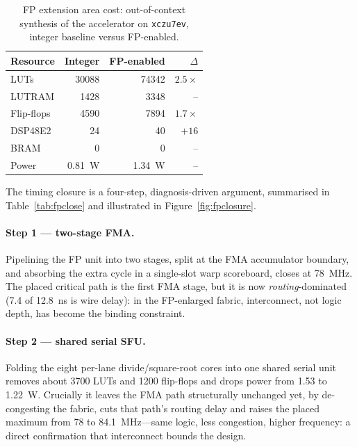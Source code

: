 \documentclass[12pt,a4paper,oneside]{report}
\newcommand{\code}[1]{\texttt{#1}}
\begin{document}
\begin{table}[t]
\caption{FP extension area cost: out-of-context synthesis of the accelerator on
\code{xczu7ev}, integer baseline versus FP-enabled.}
\label{tab:fppa}
\centering
\small
\begin{tabular}{lrrr}
\toprule
Resource & Integer & FP-enabled & $\Delta$\\
\midrule
LUTs         & \num{30088} & \num{74342} & $2.5\times$\\
\quad LUTRAM & \num{1428}  & \num{3348}  & --\\
Flip-flops   & \num{4590}  & \num{7894}  & $1.7\times$\\
DSP48E2      & 24          & 40          & $+16$\\
BRAM         & 0           & 0           & --\\
Power        & 0.81~W      & 1.34~W      & --\\
\bottomrule
\end{tabular}
\end{table}

The timing closure is a four-step, diagnosis-driven argument, summarised in
Table~\ref{tab:fpclose} and illustrated in Figure~\ref{fig:fpclosure}.

\paragraph{Step 1 --- two-stage FMA.} Pipelining the FP unit into two stages, split
at the FMA accumulator boundary, and absorbing the extra cycle in a single-slot
warp scoreboard, closes at \SI{78}{\mega\hertz}. The placed critical path is the
first FMA stage, but it is now \emph{routing}-dominated (7.4 of \SI{12.8}{\nano\second}
is wire delay): in the FP-enlarged fabric, interconnect, not logic depth, has
become the binding constraint.

\paragraph{Step 2 --- shared serial SFU.} Folding the eight per-lane
divide/square-root cores into one shared serial unit removes about \num{3700} LUTs
and \num{1200} flip-flops and drops power from \num{1.53} to \SI{1.22}{\watt}.
Crucially it leaves the FMA path structurally unchanged yet, by de-congesting the
fabric, cuts that path's routing delay and raises the placed maximum from 78 to
\SI{84.1}{\mega\hertz}---same logic, less congestion, higher frequency: a direct
confirmation that interconnect bounds the design.
\end{document}
